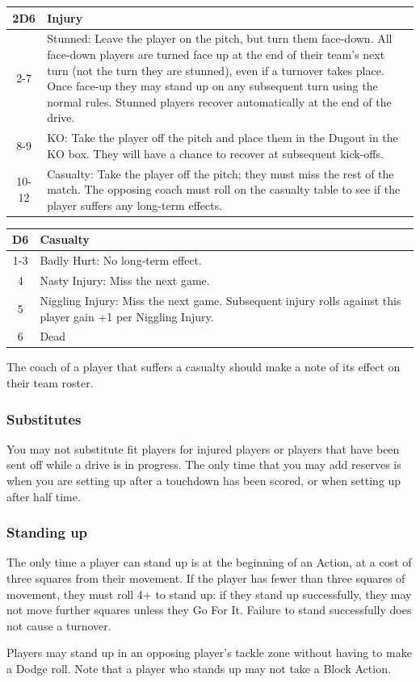\documentclass{article}
\begin{document}
\begin{multicols}{2}
\medskip
\begin{tabularx}{\linewidth}{ | c | X | }
\hline
\textbf{2D6} & \textbf{Injury} \\
\hline
2-7 & Stunned: Leave the player on the pitch, but turn them face-down. All face-down players are turned face up at the end of their team's next turn (not the turn they are stunned), even if a turnover takes place. Once face-up they may stand up on any subsequent turn using the normal rules. Stunned players recover automatically at the end of the drive. \\
\hline
8-9 & KO: Take the player off the pitch and place them in the Dugout in the KO box. They will have a chance to recover at subsequent kick-offs. \\
\hline
10-12 & Casualty: Take the player off the pitch; they must miss the rest of the match. The opposing coach must roll on the casualty table to see if the player suffers any long-term effects. \\
\hline
\end{tabularx}
\medskip

\medskip
\begin{tabularx}{\linewidth}{ | c | X | }
\hline
\textbf{D6} & \textbf{Casualty} \\
\hline
1-3 & Badly Hurt: No long-term effect. \\
\hline
4 & Nasty Injury: Miss the next game. \\
\hline
5 & Niggling Injury: Miss the next game. Subsequent injury rolls against this player gain +1 per Niggling Injury. \\
\hline
6 & Dead \\
\hline
\end{tabularx}
\medskip

\par The coach of a player that suffers a casualty should make a note of its effect on their team roster.

\subsubsection{Substitutes}
\par You may not substitute fit players for injured players or players that have been sent off while a drive is in progress. The only time that you may add reserves is when you are setting up after a touchdown has been scored, or when setting up after half time.

\subsubsection{Standing up}
\par The only time a player can stand up is at the beginning of an Action, at a cost of three squares from their movement. If the player has fewer than three squares of movement, they must roll 4+ to stand up: if they stand up successfully, they may not move further squares unless they Go For It. Failure to stand successfully does not cause a turnover.
\par Players may stand up in an opposing player's tackle zone without having to make a Dodge roll. Note that a player who stands up may not take a Block Action.


\end{multicols}
\end{document}
